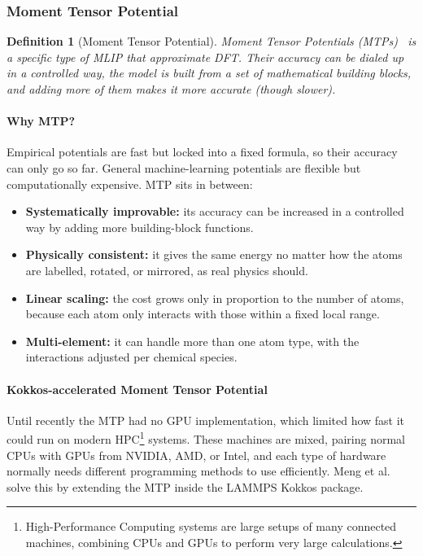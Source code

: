 \documentclass{article}
\newtheorem{definition}{Definition}
\begin{document}
\subsubsection{Moment Tensor Potential}
\begin{definition}[Moment Tensor Potential]
    Moment Tensor Potentials (MTPs)~\cite{shapeev2016} is a specific type of MLIP that approximate DFT. Their accuracy can be dialed up in a controlled way, the model is built from a set of mathematical building blocks, and adding more of them makes it more accurate (though slower).
\end{definition}

\paragraph{Why MTP?}
Empirical potentials are fast but locked into a fixed formula, so their accuracy can only go so far. General machine-learning potentials are flexible but computationally expensive. MTP sits in between:
\begin{itemize}
    \item \textbf{Systematically improvable:} its accuracy can be increased in a controlled way by adding more building-block functions.
    \item \textbf{Physically consistent:} it gives the same energy no matter how the atoms are labelled, rotated, or mirrored, as real physics should.
    \item \textbf{Linear scaling:} the cost grows only in proportion to the number of atoms, because each atom only interacts with those within a fixed local range.
    \item \textbf{Multi-element:} it can handle more than one atom type, with the interactions adjusted per chemical species.
\end{itemize}

\paragraph{Kokkos-accelerated Moment Tensor Potential}

Until recently the MTP had no GPU implementation, which limited how fast it could run on modern HPC\footnote{High-Performance Computing systems are large setups of many connected machines, combining CPUs and GPUs to perform very large calculations.} systems. These machines are mixed, pairing normal CPUs with GPUs from NVIDIA, AMD, or Intel, and each type of hardware normally needs different programming methods to use efficiently. Meng et al.~\cite{meng2026} solve this by extending the MTP inside the LAMMPS Kokkos package.
\end{document}
